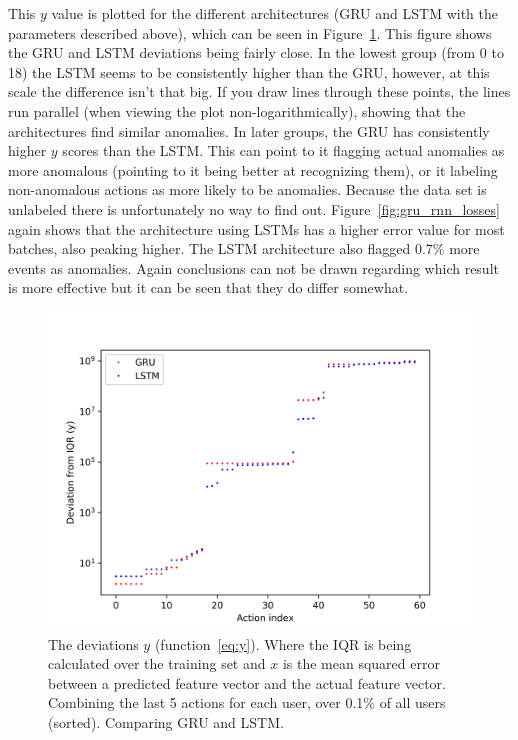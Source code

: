 This \(y\) value is plotted for the different architectures (GRU and LSTM with the parameters described above), which can be seen in Figure~\ref{fig:gru_vs_lstm}. This figure shows the GRU and LSTM deviations being fairly close. In the lowest group (from 0 to 18) the LSTM seems to be consistently higher than the GRU, however, at this scale the difference isn't that big. If you draw lines through these points, the lines run parallel (when viewing the plot non-logarithmically), showing that the architectures find similar anomalies. In later groups, the GRU has consistently higher \(y\) scores than the LSTM. This can point to it flagging actual anomalies as more anomalous (pointing to it being better at recognizing them), or it labeling non-anomalous actions as more likely to be anomalies. Because the data set is unlabeled there is unfortunately no way to find out. Figure~\ref{fig:gru_rnn_losses} again shows that the architecture using LSTMs has a higher error value for most batches, also peaking higher. The LSTM architecture also flagged 0.7\% more events as anomalies. Again conclusions can not be drawn regarding which result is more effective but it can be seen that they do differ somewhat.

\begin{figure}
	\begin{center}
		\includegraphics[scale=0.8]{experiments/cell/deviations/gru_vs_lstm}
	\end{center}
	\caption{The deviations \(y\) (function~\ref{eq:y}). Where the IQR is being calculated over the training set and \(x\) is the mean squared error between a predicted feature vector and the actual feature vector. Combining the last 5 actions for each user, over 0.1\% of all users (sorted). Comparing GRU and LSTM.~\label{fig:gru_vs_lstm}}
\end{figure}

